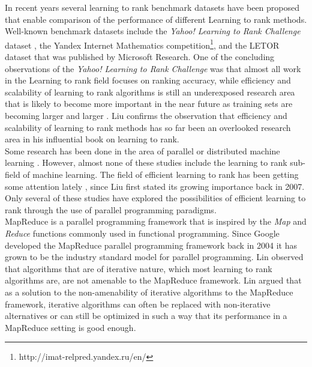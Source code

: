 \documentclass{sig-alternate}
\begin{document}
In recent years several learning to rank benchmark datasets have been proposed that enable comparison of the performance of different Learning to rank methods. Well-known benchmark datasets include the \emph{Yahoo! Learning to Rank Challenge} dataset \cite{Chapelle2011a}, the Yandex Internet Mathematics competition\footnote{http://imat-relpred.yandex.ru/en/}, and the LETOR dataset \cite{Qin2010} that was published by Microsoft Research. One of the concluding observations of the \emph{Yahoo! Learning to Rank Challenge} was that almost all work in the Learning to rank field focuses on ranking accuracy, while efficiency and scalability of learning to rank algorithms is still an underexposed research area that is likely to become more important in the near future as training sets are becoming larger and larger \cite{Chapelle2011b}. Liu \cite{Liu2007} confirms the observation that efficiency and scalability of learning to rank methods has so far been an overlooked research area in his influential book on learning to rank.\\

Some research has been done in the area of parallel or distributed machine learning \cite{Chu2007,Chang2007}. However, almost none of these studies include the learning to rank sub-field of machine learning. The field of efficient learning to rank has been getting some attention lately \cite{Asadi2013a,Asadi2013b,Busa-Fekete2012,Sousa2012,Shukla2012}, since Liu \cite{Liu2007} first stated its growing importance back in 2007. Only several of these studies \cite{Sousa2012,Shukla2012} have explored the possibilities of efficient learning to rank through the use of parallel programming paradigms.\\

MapReduce \cite{Dean2004} is a parallel programming framework that is inspired by the \emph{Map} and \emph{Reduce} functions commonly used in functional programming. Since Google developed the MapReduce parallel programming framework back in 2004 it has grown to be the industry standard model for parallel programming. Lin \cite{Lin2013} observed that algorithms that are of iterative nature, which most learning to rank algorithms are, are not amenable to the MapReduce framework. Lin argued that as a solution to the non-amenability of iterative algorithms to the MapReduce framework, iterative algorithms can often be replaced with non-iterative alternatives or can still be optimized in such a way that its performance in a MapReduce setting is good enough.\\
\end{document}
